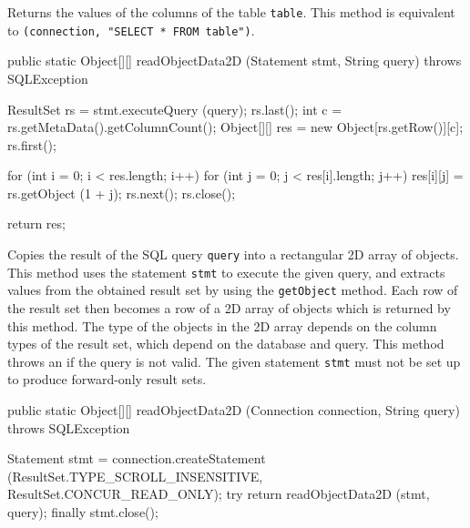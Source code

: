 \begin{tabb}
   Returns the values of the columns of the table \texttt{table}.
   This method is equivalent to 
   \texttt{(connection, "SELECT * FROM table")}.
\end{tabb}
\begin{code}

   public static Object[][] readObjectData2D (Statement stmt, String query)
            throws SQLException\begin{hide} {
      ResultSet rs = stmt.executeQuery (query);
      rs.last();
      int c = rs.getMetaData().getColumnCount();
      Object[][] res = new Object[rs.getRow()][c];
      rs.first();
        
      for (int i = 0; i < res.length; i++) {
         for (int j = 0; j < res[i].length; j++)
            res[i][j] = rs.getObject (1 + j);
         rs.next();
      }
      rs.close();
            
      return res;
   }\end{hide}
\end{code}
\begin{tabb}
   Copies the result of the SQL query \texttt{query} into a
   rectangular 2D array of objects.
   This method uses the statement \texttt{stmt} to execute the given query, and
   extracts values from the obtained result set by using the \texttt{getObject} method.
   Each row of the result set then becomes a row of a 2D array of objects
   which is returned by this method.
    The type of the objects in the 2D array depends on the column types of
    the result set, which depend on the database and query.
    This method throws an  if the query is not valid.
   The given statement \texttt{stmt} must not be set up to
   produce forward-only result sets.
\end{tabb}
\begin{htmlonly}
\end{htmlonly}
\begin{code}

   public static Object[][] readObjectData2D (Connection connection,
                                              String query)
            throws SQLException\begin{hide} {
      Statement stmt = connection.createStatement
      (ResultSet.TYPE_SCROLL_INSENSITIVE, ResultSet.CONCUR_READ_ONLY);
      try {
         return readObjectData2D (stmt, query);
      }
      finally {
         stmt.close();
      }
   }\end{hide}
\end{code}
